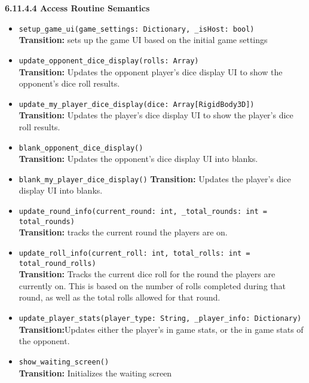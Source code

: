 \documentclass[12pt, titlepage]{article}
\begin{document}
\textbf{6.11.4.4 Access Routine Semantics}
\begin{itemize}

	\item \texttt{setup\_game\_ui(game\_settings: Dictionary, \_isHost: bool)}\\
	\textbf{Transition:} sets up the game UI based on the initial game settings
	
	\item \texttt{update\_opponent\_dice\_display(rolls: Array)}\\
	\textbf{Transition:} Updates the opponent player's dice display UI to show the opponent's dice roll results. 

	\item \texttt{update\_my\_player\_dice\_display(dice: Array[RigidBody3D])}\\
	\textbf{Transition:} Updates the player's dice display UI to show the player's dice roll results.
	
	\item \texttt{blank\_opponent\_dice\_display()}\\
	\textbf{Transition:} Updates the opponent's dice display UI into blanks.
	
	\item \texttt{blank\_my\_player\_dice\_display()}
	\textbf{Transition:} Updates the player's dice display UI into blanks.
	
	\item \texttt{update\_round\_info(current\_round: int, \_total\_rounds: int = total\_rounds)}\\
	\textbf{Transition:} tracks the current round the players are on.
	
	\item \texttt{update\_roll\_info(current\_roll: int, total\_rolls: int = total\_round\_rolls)}\\
	\textbf{Transition:} Tracks the current dice roll for the round the players are currently on. This is based on the number of rolls completed during that round, as well as the total rolls allowed for that round.
	
	\item \texttt{update\_player\_stats(player\_type: String, \_player\_info: Dictionary) } \\
	\textbf{Transition:}Updates either the player's in game stats, or the in game stats of the opponent.
	
	\item \texttt{show\_waiting\_screen() } \\
	\textbf{Transition:} Initializes the waiting screen
	

\end{itemize}
\end{document}
